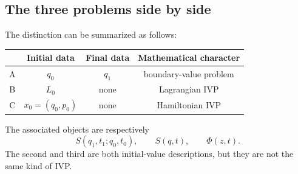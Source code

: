 \subsection{The three problems side by side}
The distinction can be summarized as follows:
\begin{center}
\begin{tabular}{c|c|c|c}
  & Initial data & Final data & Mathematical character\\ \hline
A & \(q_0\)      & \(q_1\)    &boundary-value problem \\
B &\(L_0\)       &none        & Lagrangian IVP\\
C &\(x_0=(q_0,p_0)\)&none&Hamiltonian IVP
\end{tabular}
\end{center}
The associated objects are respectively
\begin{equation}
\boxed{
S(q_1,t_1;q_0,t_0),
\qquad
S(q,t),
\qquad
\Phi(z,t).
}
\end{equation}
The second and third are both initial-value descriptions, but they are not
the same kind of IVP.

